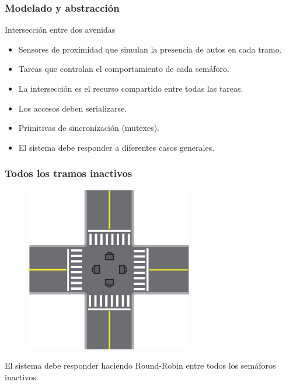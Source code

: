 \begin{frame}
\frametitle{Modelado y abstracción}
\begin{block}{Intersección entre dos avenidas}
	\begin{itemize}
		\item Sensores de proximidad que simulan la presencia de autos en cada tramo.
		\item Tareas que controlan el comportamiento de cada semáforo.
		\item La intersección es el recurso compartido entre todas las tareas.
		\item Los accesos deben serializarse.
		\item Primitivas de sincronización (mutexes).
		\item El sistema debe responder a diferentes casos generales.
	\end{itemize}
\end{block}
\end{frame}

\begin{frame}
\frametitle{Todos los tramos inactivos}
	\begin{figure}[htbp]
		\centering
		\includegraphics[width=0.65\textwidth]{diagramas/ningun-activo.eps}
	\end{figure}
	El sistema debe responder haciendo Round-Robin entre todos los semáforos inactivos.
\end{frame}

